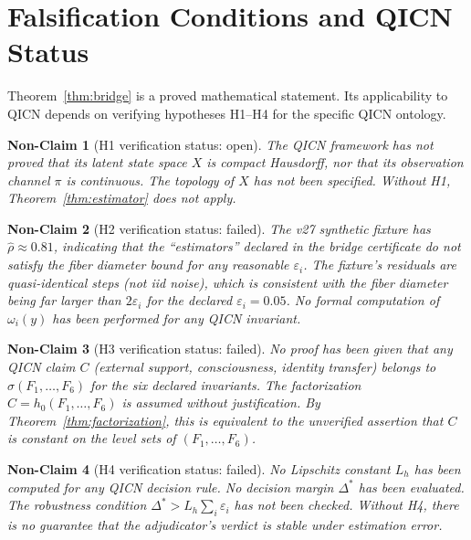 \documentclass[11pt]{article}
\newtheorem{nonclaim}{Non-Claim}
\begin{document}
\section{Falsification Conditions and QICN Status}
\label{sec:falsification}

Theorem~\ref{thm:bridge} is a proved mathematical statement. Its applicability to QICN depends on verifying hypotheses H1--H4 for the specific QICN ontology.

\begin{nonclaim}[H1 verification status: open]
The QICN framework has not proved that its latent state space $X$ is compact Hausdorff, nor that its observation channel $\pi$ is continuous. The topology of $X$ has not been specified. Without H1, Theorem~\ref{thm:estimator} does not apply.
\end{nonclaim}

\begin{nonclaim}[H2 verification status: failed]
The v27 synthetic fixture has $\hat\rho\approx 0.81$, indicating that the ``estimators'' declared in the bridge certificate do not satisfy the fiber diameter bound for any reasonable $\varepsilon_i$. The fixture's residuals are quasi-identical steps (not iid noise), which is consistent with the fiber diameter being far larger than $2\varepsilon_i$ for the declared $\varepsilon_i=0.05$. No formal computation of $\omega_i(y)$ has been performed for any QICN invariant.
\end{nonclaim}

\begin{nonclaim}[H3 verification status: failed]
No proof has been given that any QICN claim $C$ (external support, consciousness, identity transfer) belongs to $\sigma(F_1,\ldots,F_6)$ for the six declared invariants. The factorization $C=h_0(F_1,\ldots,F_6)$ is assumed without justification. By Theorem~\ref{thm:factorization}, this is equivalent to the unverified assertion that $C$ is constant on the level sets of $(F_1,\ldots,F_6)$.
\end{nonclaim}

\begin{nonclaim}[H4 verification status: failed]
No Lipschitz constant $L_h$ has been computed for any QICN decision rule. No decision margin $\Delta^{*}$ has been evaluated. The robustness condition $\Delta^{*}>L_h\sum_i\varepsilon_i$ has not been checked. Without H4, there is no guarantee that the adjudicator's verdict is stable under estimation error.
\end{nonclaim}
\end{document}
